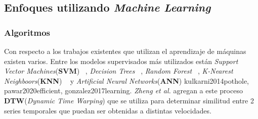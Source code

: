 	\subsection{Enfoques utilizando \emph{Machine Learning}}
		\subsubsection{Algoritmos}
			Con respecto a los trabajos existentes que utilizan el aprendizaje de máquinas existen varios. Entre los modelos supervisados
			más utilizados están \emph{Support Vector Machines}(\textbf{SVM}) ~, \emph{Decision Trees} ~, \emph{Random Forest} ~, \emph{K-Nearest Neighboors}(\textbf{KNN})
			~ y \emph{Artificial Neural Networks}(\textbf{ANN}) \brackcite
			{kulkarni2014pothole, pawar2020efficient, gonzalez2017learning}. \emph{Zheng et al.}  agregan a este proceso
			\textbf{DTW}(\emph{Dynamic Time Warping}) que se utiliza para determinar similitud entre 2 series temporales que puedan ser obtenidas
			a distintas velocidades. 

